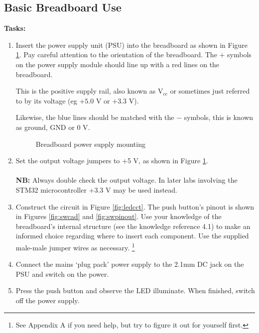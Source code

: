 \documentclass{UoNMCHA}
\numberwithin{equation}{section}
\begin{document}
\subsection{Basic Breadboard Use}
\textbf{Tasks:}
\begin{enumerate}
    \item Insert the power supply unit (PSU) into the breadboard as shown in Figure \ref{fig:psu}. Pay careful attention to the orientation of the breadboard. The $+$ symbols on the power supply module should line up with a red lines on the breadboard.
    
    This is the positive supply rail, also known as V$_{cc}$ or sometimes just referred to by its voltage (eg $+5.0$ V or $+3.3$ V).
    
    Likewise, the blue lines should be matched with the $-$ symbols, this is known as ground, GND or $0$ V.
    
    \begin{figure}[H]
    \caption{Breadboard power supply mounting}
    \label{fig:psu}
    \end{figure}
    
    
    \item Set the output voltage jumpers to +5 V, as shown in Figure \ref{fig:psu}. \\ \\ \textbf{NB:} Always double check the output voltage. In later labs involving the STM32 microcontroller +3.3 V may be used instead.

    \item Construct the circuit in Figure \ref{fig:ledcct}. The push button's pinout is shown in Figures \ref{fig:swcad} and \ref{fig:swpinout}. Use your knowledge of the breadboard's internal structure (see the knowledge reference 4.1) to make an informed choice regarding where to insert each component. Use the supplied male-male jumper wires as necessary. \footnote{See Appendix A if you need help, but try to figure it out for yourself first.}
     \item Connect the mains `plug pack' power supply to the 2.1mm DC jack on the PSU and switch on the power.
    \item Press the push button and observe the LED illuminate. When finished, switch off the power supply.

\end{enumerate}
\end{document}
